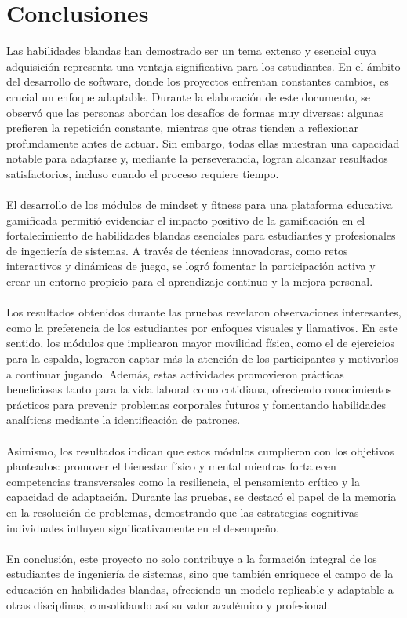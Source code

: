 \section{Conclusiones}

Las habilidades blandas han demostrado ser un tema extenso y esencial cuya adquisición representa una ventaja significativa para los estudiantes. En el ámbito del desarrollo de software, donde los proyectos enfrentan constantes cambios, es crucial un enfoque adaptable. Durante la elaboración de este documento, se observó que las personas abordan los desafíos de formas muy diversas: algunas prefieren la repetición constante, mientras que otras tienden a reflexionar profundamente antes de actuar. Sin embargo, todas ellas muestran una capacidad notable para adaptarse y, mediante la perseverancia, logran alcanzar resultados satisfactorios, incluso cuando el proceso requiere tiempo.
\\ \\
El desarrollo de los módulos de mindset y fitness para una plataforma educativa gamificada permitió evidenciar el impacto positivo de la gamificación en el fortalecimiento de habilidades blandas esenciales para estudiantes y profesionales de ingeniería de sistemas. A través de técnicas innovadoras, como retos interactivos y dinámicas de juego, se logró fomentar la participación activa y crear un entorno propicio para el aprendizaje continuo y la mejora personal.
\\ \\
Los resultados obtenidos durante las pruebas revelaron observaciones interesantes, como la preferencia de los estudiantes por enfoques visuales y llamativos. En este sentido, los módulos que implicaron mayor movilidad física, como el de ejercicios para la espalda, lograron captar más la atención de los participantes y motivarlos a continuar jugando. Además, estas actividades promovieron prácticas beneficiosas tanto para la vida laboral como cotidiana, ofreciendo conocimientos prácticos para prevenir problemas corporales futuros y fomentando habilidades analíticas mediante la identificación de patrones.
\\ \\
Asimismo, los resultados indican que estos módulos cumplieron con los objetivos planteados: promover el bienestar físico y mental mientras fortalecen competencias transversales como la resiliencia, el pensamiento crítico y la capacidad de adaptación. Durante las pruebas, se destacó el papel de la memoria en la resolución de problemas, demostrando que las estrategias cognitivas individuales influyen significativamente en el desempeño.
\\ \\
En conclusión, este proyecto no solo contribuye a la formación integral de los estudiantes de ingeniería de sistemas, sino que también enriquece el campo de la educación en habilidades blandas, ofreciendo un modelo replicable y adaptable a otras disciplinas, consolidando así su valor académico y profesional.

